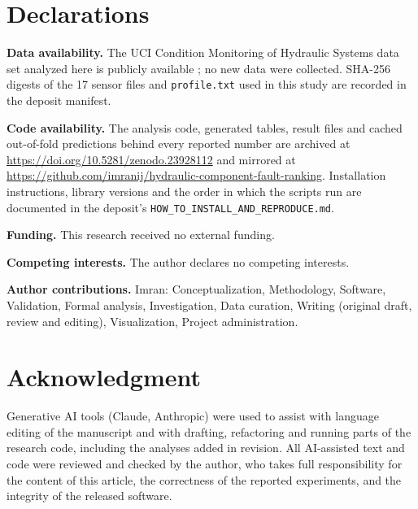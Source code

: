 \documentclass[journal]{IEEEtran}
\newcommand{\depositdoi}{10.5281/zenodo.23928112}
\newcommand{\repourl}{https://github.com/imranij/hydraulic-component-fault-ranking}
\begin{document}
\section*{Declarations}

\textbf{Data availability.} The UCI Condition Monitoring of Hydraulic Systems data
set analyzed here is publicly available \cite{Helwig2015Hydraulic,Dua2019UCI}; no new
data were collected. SHA-256 digests of the 17 sensor files and \texttt{profile.txt}
used in this study are recorded in the deposit manifest.

\textbf{Code availability.} The analysis code, generated tables, result files and cached
out-of-fold predictions behind every reported number are archived at
\url{https://doi.org/\depositdoi} and mirrored at \url{\repourl}. Installation
instructions, library versions and the order in which the scripts run are documented
in the deposit's \nolinkurl{HOW_TO_INSTALL_AND_REPRODUCE.md}.

\textbf{Funding.} This research received no external funding.

\textbf{Competing interests.} The author declares no competing interests.

\textbf{Author contributions.} Imran: Conceptualization, Methodology, Software,
Validation, Formal analysis, Investigation, Data curation, Writing (original draft,
review and editing), Visualization, Project administration.

\section*{Acknowledgment}

Generative AI tools (Claude, Anthropic) were used to assist with language editing
of the manuscript and with drafting, refactoring and running parts of the research
code, including the analyses added in revision. All AI-assisted text and code were
reviewed and checked by the author, who takes full responsibility for the content of
this article, the correctness of the reported experiments, and the integrity of the
released software.



\end{document}
